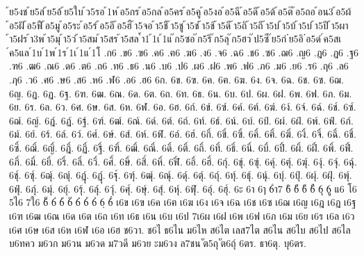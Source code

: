 {้ย5งช
้ย5ล่
้ย5อ้
้ย5ใบ
้ว5รอ
้1ห
้อ5กร
้อ5กล
้อ5คร
้อ5คู
้อ5งอ
้อ5ฉี
้อ5ดึ
้อ5ด้
้อ5ต๊
้อ5ถอ
้อน3
้อ5ผ้
้อ5ฝั
้อ5ฟื
้อ5มู
้อ5ระ
้อ5ร่
้อ5อึ
้อ5ฮื
้า5จอ
้า5ชื
้า5ชู
้า5ช่
้า5ช้
้า5ดี
้า5ถิ
้า5ถึ
้า5บ่
้า5บ้
้า5บ๋
้า5ปี
้า5ผา
้า5ฝร
้า3พ
้า5มุ
้า5ว่
้า5สม
้า5สร
้า5สล
้ำ1
้1เ
้1แ
๊ก5ซอ
๊ก5ริ
๊ก5ลุ
๊ก5ฮว
๊ป5ซี
๊ย5ก่
๋ย5อิ
๋อ5ด๋
์ค5สเ
์ค5แล
์1บ
์1พ
์1ร
์1เ
์1แ
์1โ
.ก6
.ข6
.ฃ6
.ค6
.ฅ6
.ฆ6
.ง6
.จ6
.ฉ6
.ช6
.ซ6
.ฌ6
.ญ6
.ฎ6
.ฏ6
.ฐ6
.ฑ6
.ฒ6
.ณ6
.ด6
.ต6
.ถ6
.ท6
.ธ6
.น6
.บ6
.ป6
.ผ6
.ฝ6
.พ6
.ฟ6
.ภ6
.ม6
.ย6
.ร6
.ฤ6
.ล6
.ฦ6
.ว6
.ศ6
.ษ6
.ส6
.ห6
.ฬ6
.อ6
.ฮ6
6ก.
6ข.
6ฃ.
6ค.
6ฅ.
6ฆ.
6ง.
6จ.
6ฉ.
6ช.
6ซ.
6ฌ.
6ญ.
6ฎ.
6ฏ.
6ฐ.
6ฑ.
6ฒ.
6ณ.
6ด.
6ต.
6ถ.
6ท.
6ธ.
6น.
6บ.
6ป.
6ผ.
6ฝ.
6พ.
6ฟ.
6ภ.
6ม.
6ย.
6ร.
6ล.
6ว.
6ศ.
6ษ.
6ส.
6ห.
6ฬ.
6อ.
6ฮ.
6ก์.
6ข์.
6ฃ์.
6ค์.
6ฅ์.
6ฆ์.
6ง์.
6จ์.
6ฉ์.
6ช์.
6ซ์.
6ฌ์.
6ญ์.
6ฎ์.
6ฏ์.
6ฐ์.
6ฑ์.
6ฒ์.
6ณ์.
6ด์.
6ต์.
6ถ์.
6ท์.
6ธ์.
6น์.
6บ์.
6ป์.
6ผ์.
6ฝ์.
6พ์.
6ฟ์.
6ภ์.
6ม์.
6ย์.
6ร์.
6ล์.
6ว์.
6ศ์.
6ษ์.
6ส์.
6ห์.
6ฬ์.
6อ์.
6ฮ์.
6กิ์.
6ขิ์.
6ฃิ์.
6คิ์.
6ฅิ์.
6ฆิ์.
6งิ์.
6จิ์.
6ฉิ์.
6ชิ์.
6ซิ์.
6ฌิ์.
6ญิ์.
6ฎิ์.
6ฏิ์.
6ฐิ์.
6ฑิ์.
6ฒิ์.
6ณิ์.
6ดิ์.
6ติ์.
6ถิ์.
6ทิ์.
6ธิ์.
6นิ์.
6บิ์.
6ปิ์.
6ผิ์.
6ฝิ์.
6พิ์.
6ฟิ์.
6ภิ์.
6มิ์.
6ยิ์.
6ริ์.
6ลิ์.
6วิ์.
6ศิ์.
6ษิ์.
6สิ์.
6หิ์.
6ฬิ์.
6อิ์.
6ฮิ์.
6กุ์.
6ขุ์.
6ฃุ์.
6คุ์.
6ฅุ์.
6ฆุ์.
6งุ์.
6จุ์.
6ฉุ์.
6ชุ์.
6ซุ์.
6ฌุ์.
6ญุ์.
6ฎุ์.
6ฏุ์.
6ฐุ์.
6ฑุ์.
6ฒุ์.
6ณุ์.
6ดุ์.
6ตุ์.
6ถุ์.
6ทุ์.
6ธุ์.
6นุ์.
6บุ์.
6ปุ์.
6ผุ์.
6ฝุ์.
6พุ์.
6ฟุ์.
6ภุ์.
6มุ์.
6ยุ์.
6รุ์.
6ลุ์.
6วุ์.
6ศุ์.
6ษุ์.
6สุ์.
6หุ์.
6ฬุ์.
6อุ์.
6ฮุ์.
6ะ
6า
6ๅ
6ำ7
6ิ
6ี
6ึ
6ื
6ุ
6ู
แ6
โ6
5ไ6
7ใ6
6็
6่
6้
6๊
6๋
6์
6ํ
6ฺ
6๎
เ6ข
เ6ฃ
เ6ค
เ6ฅ
เ6ฆ
เ6ง
เ6จ
เ6ฉ
เ6ช
เ6ซ
เ6ฌ
เ6ญ
เ6ฎ
เ6ฏ
เ6ฐ
เ6ฑ
เ6ฒ
เ6ณ
เ6ด
เ6ต
เ6ถ
เ6ท
เ6ธ
เ6น
เ6บ
เ6ป
7เ6ผ
เ6ฝ
เ6พ
เ6ฟ
เ6ภ
เ6ม
เ6ย
เ6ร
เ6ล
เ6ว
เ6ศ
เ6ษ
เ6ส
เ6ห
เ6ฬ
เ6อ
เ6ฮ
ช6วา.
ช6ไ
ธ6ไน
ม6ไห
ส6ไต
เลส7ไต
ส6ไน
ส6ไบ
ส6ไป
ส6ไล
บ6ทคว
ม6วก
ม6วน
ม6วด
ม7วดี
ม6วย
ะม6วง
ล7ชน
ัต5ถุ
ัต6ถุ์
6ตร.
ธา6ตุ.
บุ6ตร.
}
